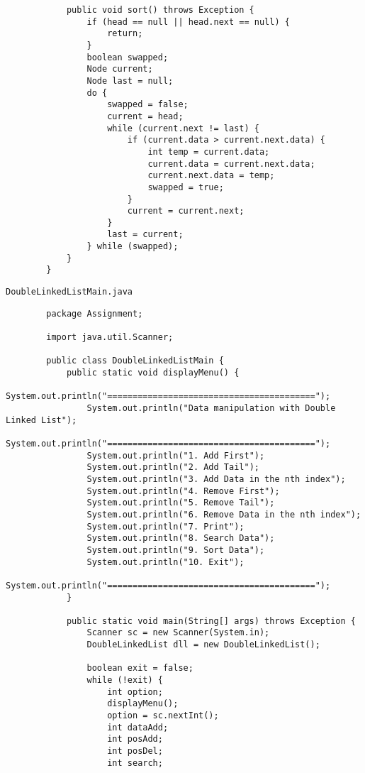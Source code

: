 \documentclass[12pt,titlepage]{article}
\begin{document}
\begin{enumerate}
\begin{verbatim}
            public void sort() throws Exception {
                if (head == null || head.next == null) {
                    return;
                }
                boolean swapped;
                Node current;
                Node last = null;
                do {
                    swapped = false;
                    current = head;
                    while (current.next != last) {
                        if (current.data > current.next.data) {
                            int temp = current.data;
                            current.data = current.next.data;
                            current.next.data = temp;
                            swapped = true;
                        }
                        current = current.next;
                    }
                    last = current;
                } while (swapped);
            }
        }

    \end{verbatim}

    \texttt{DoubleLinkedListMain.java}
    \begin{verbatim}
        package Assignment;

        import java.util.Scanner;

        public class DoubleLinkedListMain {
            public static void displayMenu() {
                System.out.println("=========================================");
                System.out.println("Data manipulation with Double Linked List");
                System.out.println("=========================================");
                System.out.println("1. Add First");
                System.out.println("2. Add Tail");
                System.out.println("3. Add Data in the nth index");
                System.out.println("4. Remove First");
                System.out.println("5. Remove Tail");
                System.out.println("6. Remove Data in the nth index");
                System.out.println("7. Print");
                System.out.println("8. Search Data");
                System.out.println("9. Sort Data");
                System.out.println("10. Exit");
                System.out.println("=========================================");
            }

            public static void main(String[] args) throws Exception {
                Scanner sc = new Scanner(System.in);
                DoubleLinkedList dll = new DoubleLinkedList();
                
                boolean exit = false;
                while (!exit) {
                    int option;
                    displayMenu();
                    option = sc.nextInt();
                    int dataAdd;
                    int posAdd;
                    int posDel;
                    int search;


\end{verbatim}
\end{enumerate}
\end{document}
